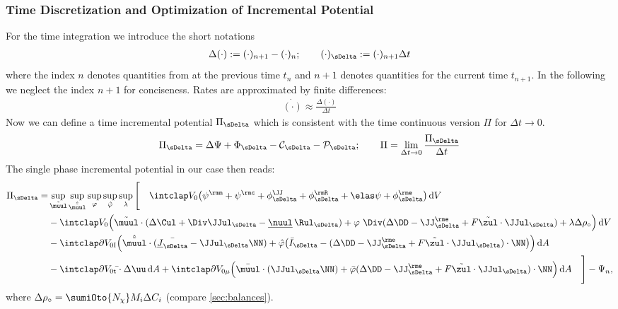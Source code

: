 \subsubsection{Time Discretization and Optimization of Incremental Potential} \label{sec:singlePhaseTime} %

For the time integration we introduce the short notations
\begin{align}
  \Delta(\cdot) := (\cdot)_{n+1}-(\cdot)_n; \qquad (\cdot)_{\sDelta} := (\cdot)_{n+1}\Delta t
\end{align}
where the index $n$ denotes quantities from at the previous time $t_n$ and $n+1$ denotes quantities for the current time $t_{n+1}$. In the following we neglect the index $n+1$ for conciseness. Rates are approximated by finite differences:
\begin{align}
  \dot{(\cdot)} \approx \frac{\Delta(\cdot)}{\Delta t}
\end{align} 
Now we can define a time incremental potential $\PiDelta$ which is consistent with the time continuous version $\Pi$ for $\Delta t \rightarrow 0$.
\begin{align}
  \PiDelta = \Delta \Psi + \PhiDelta - \ConstDelta - \Pow_{\sDelta}; \qquad \Pi = \lim_{\Delta t \rightarrow0} \frac{\PiDelta}{\Delta t}
\end{align}
The single phase incremental potential in our case then reads:
\begin{align}
  \begin{aligned}
  \PiDelta =& \sup_{\muultilde} \sup_{\hat\muultilde} \sup_{\varphi} \sup_{\hat\varphi} \sup_{\lambda} \Bigg[ \quad \intVO \big(\psim + \psic + \phiJJDelta + \phiRDelta + \psie + \phieDelta \big) \dV \\
            &- \intVO \Big(\muultilde\cdot(\Delta\Cul+\Div\JJulDelta-\nuull\,\RulDelta) + \varphi\ \Div(\Delta\DD - \JJeDelta + F\zultilde\cdot\JJulDelta) + \lambda \Delta\rho_\circ\Big) \dV \\
            &- \intdVOx{I} \Big(\hat\muultilde \cdot (\bar\JulDelta - \JJulDelta\NN) + \hat\varphi \big(\bar I_{\sDelta}  - (\Delta\DD-\JJeDelta+F\zultilde\cdot\JJulDelta)\cdot\NN\big) \Big) \dA \\
            &- \intdVOx{t} \bar\tt \cdot \Delta\uu \dA + \intdVOx{\mu} \Big(\bar\muul\cdot(\JJulDelta\NN) + \bar\varphi(\Delta\DD-\JJeDelta+F\tilde\zul\cdot\JJulDelta)\cdot\NN \Big) \dA \quad 
            \Bigg] - \Psi_n,
  \end{aligned}                                      
\end{align}
where $\Delta\rho_\circ=\sumiOto{\Nchi}M_i \Delta C_i$ (compare \cref{sec:balances}). 

